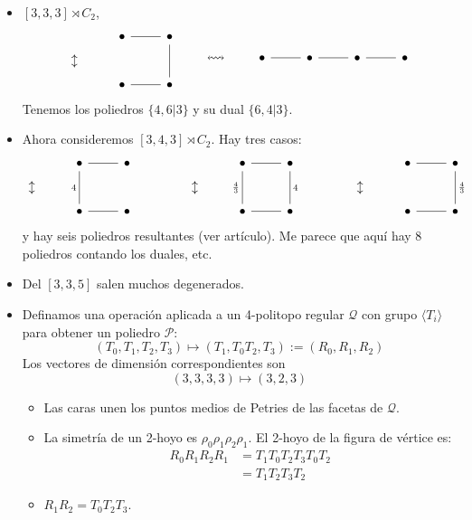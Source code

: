 \documentclass[spanish]{article}
\theoremstyle{definition}
\newcommand{\p}{\mathcal{P}}
\newcommand{\q}{\mathcal{Q}}
\begin{document}
\begin{itemize}
	\item $[3,3,3]\rtimes C_2$,
\[\begin{tikzcd}[row sep=tiny]
	&\bullet\arrow[r,no head]&\bullet\arrow[dd,no head]\\\updownarrow\\
	&\bullet\arrow[r,no head]&\bullet
\end{tikzcd}\qquad\leftrightsquigarrow\qquad\begin{tikzcd}
\bullet\arrow[r,no head]&\bullet\arrow[r,no head]&\bullet\arrow[r,no head]&\bullet
\end{tikzcd}\]
Tenemos los poliedros $\{4,6|3\}$ y su dual $\{6,4|3\}$.

\item Ahora consideremos $[3,4,3]\rtimes C_2$. Hay tres casos:
\[\begin{tikzcd}[row sep=tiny]
	&\bullet\arrow[r,no head]\arrow[dd,"4",swap,no head]&\bullet\\\updownarrow\\
	&\bullet\arrow[r,no head]&\bullet
\end{tikzcd}\qquad\qquad
\begin{tikzcd}[row sep=tiny]
	&\bullet\arrow[r,no head]\arrow[dd,no head,"\frac{4}{3}",swap]&\bullet\arrow[dd,"4",no head]\\\updownarrow\\
	&\bullet\arrow[r,no head]&\bullet
\end{tikzcd}\qquad\qquad
\begin{tikzcd}[row sep=tiny]
	&\bullet\arrow[r,no head]&\bullet\arrow[dd,"\frac{4}{3}",no head]\\\updownarrow\\
	&\bullet\arrow[r,no head]&\bullet
\end{tikzcd}\]
y hay seis poliedros resultantes (ver artículo). Me parece que aquí hay 8 poliedros contando los duales, etc.

\item Del $[3,3,5]$ salen muchos degenerados.

\item Definamos una operación aplicada a un 4-politopo regular $\q$ con grupo $\langle T_i\rangle$ para obtener un poliedro $\p$:
\[(T_0,T_1,T_2,T_3)\mapsto(T_1,T_0T_2,T_3):=(R_0,R_1,R_2)\]
Los vectores de dimensión correspondientes son
\[(3,3,3,3)\mapsto(3,2,3)\]
\begin{itemize}
	\item Las caras unen los puntos medios de Petries de las facetas de $\q$.
	\item La simetría de un 2-hoyo es $\rho_0\rho_1\rho_2\rho_1$. El 2-hoyo de la figura de vértice es:
	\begin{align*}
		R_0R_1R_2R_1&=T_1T_0T_2T_3T_0T_2\\
		&=T_1T_2T_3T_2		
	\end{align*}
	\item $R_1R_2=T_0T_2T_3$.
	

\end{itemize}
\end{itemize}
\end{document}
